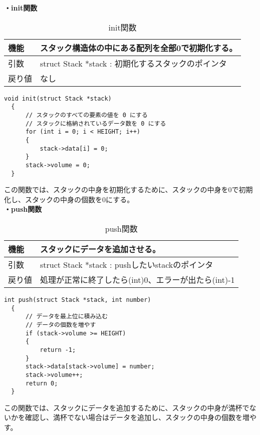 \documentclass[dvipdfmx]{jsarticle}
\begin{document}
\textbf{・init関数}
\begin{table}[ht]
  \centering
  \caption{init関数}
  \begin{tabular}{|p{5cm}|p{10cm}|}
    \hline
    機能  & スタック構造体の中にある配列を全部0で初期化する。                  \\
    \hline
    引数  & struct Stack *stack : 初期化するスタックのポインタ       \\
    \hline
    戻り値 & なし                                         \\
    \hline
  \end{tabular}
  \label{tab:init_func}
\end{table}
\newpage
\begin{lstlisting}[caption={init関数}, label={lst:init_func}]
  void init(struct Stack *stack)
  {
      // スタックのすべての要素の値を 0 にする
      // スタックに格納されているデータ数を 0 にする
      for (int i = 0; i < HEIGHT; i++)
      {
          stack->data[i] = 0;
      }
      stack->volume = 0;
  }
\end{lstlisting}
この関数では、スタックの中身を初期化するために、スタックの中身を0で初期化し、スタックの中身の個数を0にする。
\\
\textbf{・push関数}
\begin{table}[ht]
  \centering
  \caption{push関数}
  \begin{tabular}{|p{5cm}|p{10cm}|}
    \hline
    機能  & スタックにデータを追加させる。                         \\
    \hline
    引数  & struct Stack *stack : pushしたいstackのポインタ \\
    \hline
    戻り値 & 処理が正常に終了したら(int)0、エラーが出たら(int)-1                  \\
    \hline
  \end{tabular}
  \label{tab:push_func}
\end{table}
\begin{lstlisting}[caption={push関数}, label={lst:push_func}]
  int push(struct Stack *stack, int number)
  {
      // データを最上位に積み込む
      // データの個数を増やす
      if (stack->volume >= HEIGHT)
      {
          return -1;
      }
      stack->data[stack->volume] = number;
      stack->volume++;
      return 0;
  }
\end{lstlisting}
この関数では、スタックにデータを追加するために、スタックの中身が満杯でないかを確認し、満杯でない場合はデータを追加し、スタックの中身の個数を増やす。
\end{document}
